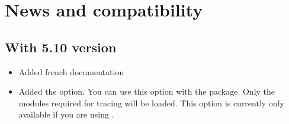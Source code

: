 \section*{News and compatibility}

\subsection{With 5.10 version}
\begin{itemize}
  \item Added french documentation
  
  \item Added the  option. You can use this option with the  package. Only the modules required for tracing will be loaded. This option is currently only available if you are using .
\end{itemize}


